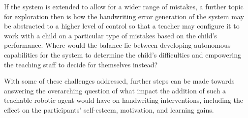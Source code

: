\documentclass{sig-alternate}
\begin{document}
If the system is extended to allow for a wider range of mistakes, a further 
topic for exploration then is how the handwriting error
generation of the system may be abstracted to a higher level of control so that
a teacher may configure it to work with a child on a particular type of
mistakes based on the child's performance. Where would the balance lie between
developing autonomous capabilities for the system to determine the child's
difficulties and empowering the teaching staff to decide for themselves
instead? 

With some of these challenges addressed, further steps can be made towards 
answering the overarching question of what impact the 
addition of such a teachable robotic agent would have on handwriting interventions, including the effect on the 
participants' self-esteem, motivation, and learning gains. %



%

%


\addtolength{\textheight}{-.5cm}   %
\end{document}
